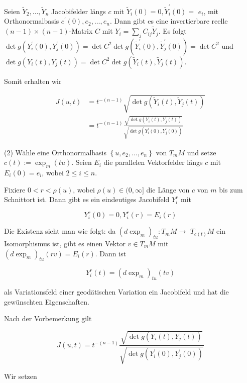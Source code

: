 \documentclass[10pt, letterpaper]{article}
\begin{document}
Seien $\tilde{Y}_{2}, \ldots, \tilde{Y}_{n}$ Jacobifelder längs $c$ mit $\tilde{Y}_{i}(0)=0, \tilde{Y}_{i}^{\prime}(0)=$ $e_{i}$, mit Orthonormalbasis $c^{\prime}(0), e_{2}, \ldots, e_{n}$. Dann gibt es eine invertierbare reelle $(n-1) \times(n-1)$-Matrix $C$ mit $Y_{i}=\sum_{j} C_{i j} \tilde{Y}_{j}$. Es folgt $\operatorname{det} g\left(Y_{i}^{\prime}(0), Y_{j}^{\prime}(0)\right)=\operatorname{det} C^{2} \operatorname{det} g\left(\tilde{Y}_{i}^{\prime}(0), \tilde{Y}_{j}^{\prime}(0)\right)=\operatorname{det} C^{2}$ und $\operatorname{det} g\left(Y_{i}(t), Y_{j}(t)\right)=\operatorname{det} C^{2} \operatorname{det} g\left(\tilde{Y}_{i}(t), \tilde{Y}_{j}(t)\right)$.

Somit erhalten wir

$$
\begin{aligned}
J(u, t) & =t^{-(n-1)} \sqrt{\operatorname{det} g\left(\tilde{Y}_{i}(t), \tilde{Y}_{j}(t)\right)} \\
& =t^{-(n-1)} \frac{\sqrt{\operatorname{det} g\left(Y_{i}(t), Y_{j}(t)\right)}}{\sqrt{\operatorname{det} g\left(Y_{i}^{\prime}(0), Y_{j}^{\prime}(0)\right)}}
\end{aligned}
$$

(2) Wähle eine Orthonormalbasis $\left\{u, e_{2}, \ldots, e_{n}\right\}$ von $T_{m} M$ und setze $c(t):=\exp _{m}(t u)$. Seien $E_{i}$ die parallelen Vektorfelder längs $c$ mit $E_{i}(0)=e_{i}$, wobei $2 \leq i \leq n$.

Fixiere $0<r<\rho(u)$, wobei $\rho(u) \in(0, \infty]$ die Länge von $c$ von $m$ bis zum Schnittort ist. Dann gibt es ein eindeutiges Jacobifeld $Y_{i}^{r}$ mit

$$
Y_{i}^{r}(0)=0, Y_{i}^{r}(r)=E_{i}(r)
$$

Die Existenz sieht man wie folgt: da $\left(d \exp _{m}\right)_{t u}: T_{m} M \rightarrow$ $T_{c(t)} M$ ein Isomorphismus ist, gibt es einen Vektor $v \in T_{m} M$ mit $\left(d \exp _{m}\right)_{t u}(r v)=E_{i}(r)$. Dann ist

$$
Y_{i}^{r}(t)=\left(d \exp _{m}\right)_{t u}(t v)
$$

als Variationsfeld einer geodätischen Variation ein Jacobifeld und hat die gewünschten Eigenschaften.

Nach der Vorbemerkung gilt

$$
J(u, t)=t^{-(n-1)} \frac{\sqrt{\operatorname{det} g\left(Y_{i}(t), Y_{j}(t)\right)}}{\sqrt{\operatorname{det} g\left(Y_{i}^{\prime}(0), Y_{j}^{\prime}(0)\right)}}
$$

Wir setzen
\end{document}
